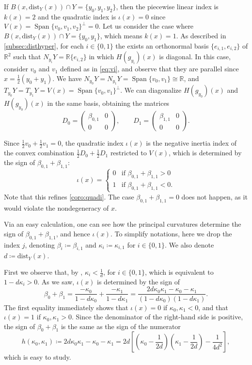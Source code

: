 \documentclass{amsart}
\newcommand{\R}{\mathbb{R}}
\newcommand{\dd}{\mathrm{dist}}
\def\lini{k}
\def\quadi{\iota}
\theoremstyle{definition}
\theoremstyle{remark}
\begin{document}
If $B(x,\dd_Y(x))\cap Y =\{y_0,y_1,y_2\}$, then the piecewise linear index is $\lini(x)=2$ and the quadratic index is $\quadi(x)=0$ since $V(x)= \operatorname{Span} \{v_0,v_1,v_2\}^\perp =0$. Let us consider the case where $B(x,\dd_Y(x))\cap Y =\{y_0,y_1\}$, which means $\lini(x)=1$. As described in \cref{subsec:disthyper}, for each $i\in \{0,1\}$ the exists an orthonormal basis $\{e_{i,1}, e_{i,2}\}$ of $\mathbb{R}^2$ such that $N_{y_i}Y =\R \{e_{i,2}\}$ in which $H(g_{y_i})(x)$ is diagonal. In this case, 
consider $v_0$ and $v_1$ defined as in \cref{eq:vi}, and observe that they are parallel since $x=\frac{1}{2}(y_0 +y_1)$. We have $N_{y_0}Y =N_{y_1}Y =\operatorname{Span} \{v_0,v_1\}\cong \R$, and $T_{y_0}Y = T_{y_1}Y = V(x) = \operatorname{Span} \{v_0,v_1\}^\perp$. We can diagonalize $H(g_{y_0})(x)$ and $H(g_{y_0})(x)$ in the same basis, 
obtaining the matrices 
\[
D_0 = \begin{pmatrix}
\beta_{0,1} & 0 \\
0 & 0 
\end{pmatrix}, \qquad
D_1 = \begin{pmatrix}
\beta_{1,1} & 0 \\
0 & 0 
\end{pmatrix} .
\]

Since $\frac{1}{2}v_0 +\frac{1}{2}v_1 =0$, the quadratic index $\quadi (x)$ is the negative inertia index of the convex combination $\frac{1}{2}D_0 +\frac{1}{2}D_1$ restricted to $V(x)$, which is determined by the sign of $\beta_{0,1}+\beta_{1,1}$:
\[
\quadi (x) = \begin{cases}
  0  & \text{if } \beta_{0,1}+\beta_{1,1}>0 \\
  1 & \text{if } \beta_{0,1}+\beta_{1,1}<0 .
\end{cases}
\]
Note that this refines \cref{coro:quadi}. The case $\beta_{0,1}+\beta_{1,1}=0$ does not happen, as it would violate the nondegeneracy of $x$.


Via an easy calculation, one can see how the principal curvatures determine the sign of $\beta_{0,1}+\beta_{1,1}$, and hence $\quadi (x)$. To simplify notations, here we drop the index $j$, denoting $\beta_i \coloneqq \beta_{i,1}$ and $\kappa_i \coloneqq \kappa_{i,1}$ for $i\in \{0,1\}$. We also denote $d\coloneqq \dd_Y (x)$. 

First we observe that, by \cite[]{milnor1963morse}, $\kappa_i < \frac{1}{d}$, for $i\in \{0,1\}$, which is equivalent to $1-d \kappa_i >0$. 
As we saw, $\quadi (x)$ is determined by the sign of
\begin{equation}\label{eq:betakappa}
\beta_0 + \beta_1 = \frac{-\kappa_0}{1-d \kappa_0} + \frac{-\kappa_1}{1-d \kappa_1} = \frac{2d \kappa_0 \kappa_1 - \kappa_0 - \kappa_1 }{(1-d \kappa_0)(1-d \kappa_1)}.
\end{equation}
The first equality immediately shows that $\quadi (x)=0$ if $\kappa_0,\kappa_1 <0$, and that $\quadi (x)=1$ if $\kappa_0,\kappa_1 >0$.
Since the denominator of the right-hand side is positive, the sign of $\beta_0 + \beta_1$ is the same as the sign of the numerator 
\[
h(\kappa_0,\kappa_1) \coloneqq 2d \kappa_0 \kappa_1 - \kappa_0 - \kappa_1 = 2d \left[ \left( \kappa_0 -\frac{1}{2d}\right)\left( \kappa_1 -\frac{1}{2d}\right) - \frac{1}{4d^2} \right],
\]
which is easy to study. 
\end{document}
